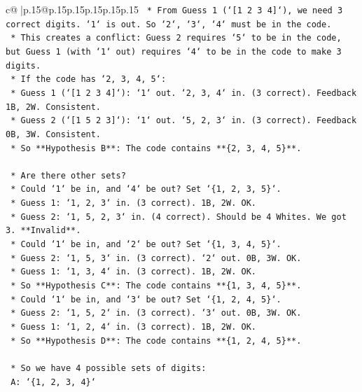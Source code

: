 \documentclass{article}
\begin{document}
{\begin{supertabular}{c@{$\;$}|p{.15\linewidth}@{}p{.15\linewidth}p{.15\linewidth}p{.15\linewidth}p{.15\linewidth}p{.15\linewidth}}
{{{\texttt{        *   From Guess 1 (`{[}1 2 3 4{]}`), we need 3 correct digits. `1` is out. So `2`, `3`, `4` must be in the code.} \\
\texttt{        *   This creates a conflict: Guess 2 requires `5` to be in the code, but Guess 1 (with `1` out) requires `4` to be in the code to make 3 digits.} \\
\texttt{        *   If the code has `2, 3, 4, 5`:} \\
\texttt{            *   Guess 1 (`{[}1 2 3 4{]}`): `1` out. `2, 3, 4` in. (3 correct). Feedback 1B, 2W. Consistent.} \\
\texttt{            *   Guess 2 (`{[}1 5 2 3{]}`): `1` out. `5, 2, 3` in. (3 correct). Feedback 0B, 3W. Consistent.} \\
\texttt{        *   So **Hypothesis B**: The code contains **\{2, 3, 4, 5\}**.} \\
\\ 
\texttt{    *   Are there other sets?} \\
\texttt{        *   Could `1` be in, and `4` be out? Set `\{1, 2, 3, 5\}`.} \\
\texttt{            *   Guess 1: `1, 2, 3` in. (3 correct). 1B, 2W. OK.} \\
\texttt{            *   Guess 2: `1, 5, 2, 3` in. (4 correct). Should be 4 Whites. We got 3. **Invalid**.} \\
\texttt{        *   Could `1` be in, and `2` be out? Set `\{1, 3, 4, 5\}`.} \\
\texttt{            *   Guess 2: `1, 5, 3` in. (3 correct). `2` out. 0B, 3W. OK.} \\
\texttt{            *   Guess 1: `1, 3, 4` in. (3 correct). 1B, 2W. OK.} \\
\texttt{            *   So **Hypothesis C**: The code contains **\{1, 3, 4, 5\}**.} \\
\texttt{        *   Could `1` be in, and `3` be out? Set `\{1, 2, 4, 5\}`.} \\
\texttt{            *   Guess 2: `1, 5, 2` in. (3 correct). `3` out. 0B, 3W. OK.} \\
\texttt{            *   Guess 1: `1, 2, 4` in. (3 correct). 1B, 2W. OK.} \\
\texttt{            *   So **Hypothesis D**: The code contains **\{1, 2, 4, 5\}**.} \\
\\ 
\texttt{    *   So we have 4 possible sets of digits:} \\
\texttt{        A: `\{1, 2, 3, 4\}`} \\
}}}
\end{supertabular}}
\end{document}
